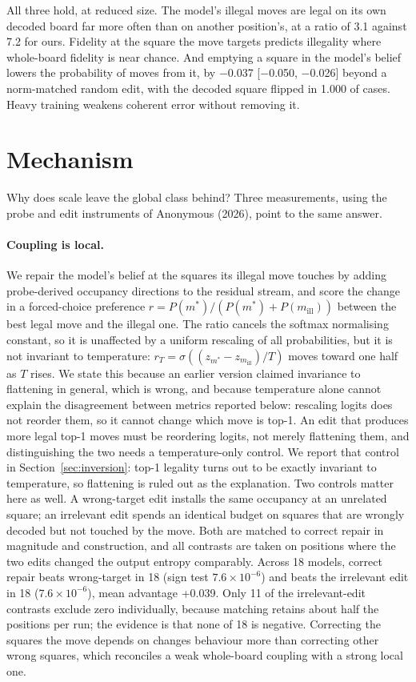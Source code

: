 \documentclass[11pt]{article}
\newcommand{\priort}{Anonymous (2026)}
\begin{document}
All three hold, at reduced size. The model's illegal moves are legal on its own
decoded board far more often than on another position's, at a ratio of
3.1 against 7.2 for ours. Fidelity at the square
the move targets predicts illegality where whole-board fidelity is near chance.
And emptying a square in the model's belief lowers the probability of moves from
it, by $-$0.037 [$-$0.050, $-$0.026] beyond a
norm-matched random edit, with the decoded square flipped in 1.000 of
cases. Heavy training weakens coherent error without removing it.

\section{Mechanism}
\label{sec:mech}

Why does scale leave the global class behind? Three measurements, using the probe
and edit instruments of \priort, point to the same answer.

\paragraph{Coupling is local.}
We repair the model's belief at the squares its illegal move touches by adding
probe-derived occupancy directions to the residual stream, and score the change in
a forced-choice preference $r = P(m^\ast)/(P(m^\ast)+P(m_{\mathrm{ill}}))$ between
the best legal move and the illegal one. The ratio cancels the softmax normalising
constant, so it is unaffected by a uniform rescaling of all probabilities, but it is
not invariant to temperature: $r_T = \sigma((z_{m^\ast} - z_{m_{\mathrm{ill}}})/T)$ moves
toward one half as $T$ rises. We state this because an earlier version claimed
invariance to flattening in general, which is wrong, and because temperature alone
cannot explain the disagreement between metrics reported below: rescaling logits
does not reorder them, so it cannot change which move is top-1. An edit that
produces more legal top-1 moves must be reordering logits, not merely flattening
them, and distinguishing the two needs a temperature-only control. We report that
control in Section~\ref{sec:inversion}: top-1 legality turns out to be exactly
invariant to temperature, so flattening is ruled out as the explanation. Two controls
matter here as well. A wrong-target edit installs the same
occupancy at an unrelated square; an irrelevant edit spends an identical budget on
squares that are wrongly decoded but not touched by the move. Both are matched to
correct repair in magnitude and construction, and all contrasts are taken on
positions where the two edits changed the output entropy comparably. Across
18 models, correct repair beats wrong-target in
18 (sign test $7.6\times10^{-6}$) and beats the irrelevant edit in
18 ($7.6\times10^{-6}$), mean advantage +0.039. Only
11 of the irrelevant-edit contrasts exclude zero individually,
because matching retains about half the positions per run; the evidence is that
none of 18 is negative. Correcting the squares the move depends on
changes behaviour more than correcting other wrong squares, which reconciles a
weak whole-board coupling \citep{balogh2026verification} with a strong local one.
\end{document}
